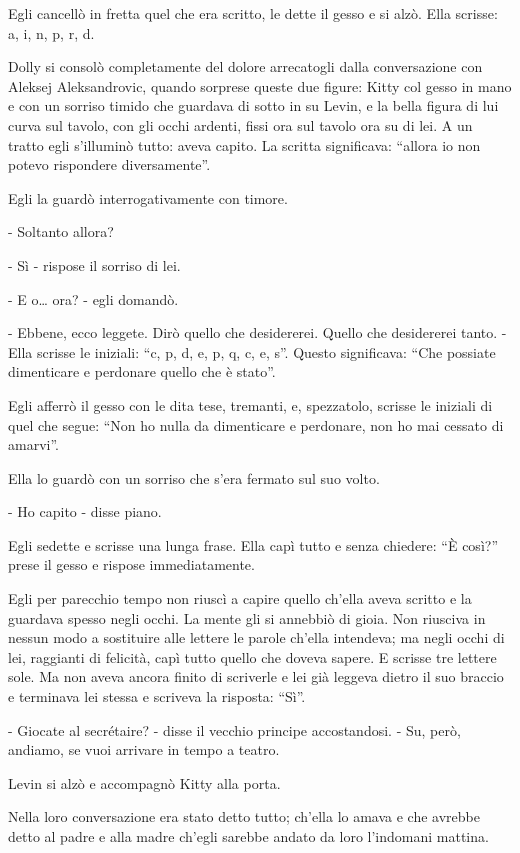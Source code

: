Egli cancellò in fretta quel che era scritto, le dette il gesso e si alzò. Ella scrisse: a, i, n, p, r, d. 

Dolly si consolò completamente del dolore arrecatogli dalla conversazione con Aleksej Aleksandrovic, quando sorprese queste due figure: Kitty col gesso in mano e con un sorriso timido che guardava di sotto in su Levin, e la bella figura di lui curva sul tavolo, con gli occhi ardenti, fissi ora sul tavolo ora su di lei. A un tratto egli s'illuminò tutto: aveva capito. La scritta significava: ``allora io non potevo rispondere diversamente''. 

Egli la guardò interrogativamente con timore. 

- Soltanto allora? 

- Sì - rispose il sorriso di lei. 

- E o\ldots{} ora? - egli domandò. 

- Ebbene, ecco leggete. Dirò quello che desidererei. Quello che desidererei tanto. - Ella scrisse le iniziali: ``c, p, d, e, p, q, c, e, s''. Questo significava: ``Che possiate dimenticare e perdonare quello che è stato''. 

Egli afferrò il gesso con le dita tese, tremanti, e, spezzatolo, scrisse le iniziali di quel che segue: ``Non ho nulla da dimenticare e perdonare, non ho mai cessato di amarvi''. 

Ella lo guardò con un sorriso che s'era fermato sul suo volto. 

- Ho capito - disse piano. 

Egli sedette e scrisse una lunga frase. Ella capì tutto e senza chiedere: ``È così?'' prese il gesso e rispose immediatamente. 

Egli per parecchio tempo non riuscì a capire quello ch'ella aveva scritto e la guardava spesso negli occhi. La mente gli si annebbiò di gioia. Non riusciva in nessun modo a sostituire alle lettere le parole ch'ella intendeva; ma negli occhi di lei, raggianti di felicità, capì tutto quello che doveva sapere. E scrisse tre lettere sole. Ma non aveva ancora finito di scriverle e lei già leggeva dietro il suo braccio e terminava lei stessa e scriveva la risposta: ``Sì''. 

- Giocate al secrétaire? - disse il vecchio principe accostandosi. - Su, però, andiamo, se vuoi arrivare in tempo a teatro. 

Levin si alzò e accompagnò Kitty alla porta. 

Nella loro conversazione era stato detto tutto; ch'ella lo amava e che avrebbe detto al padre e alla madre ch'egli sarebbe andato da loro l'indomani mattina. 

